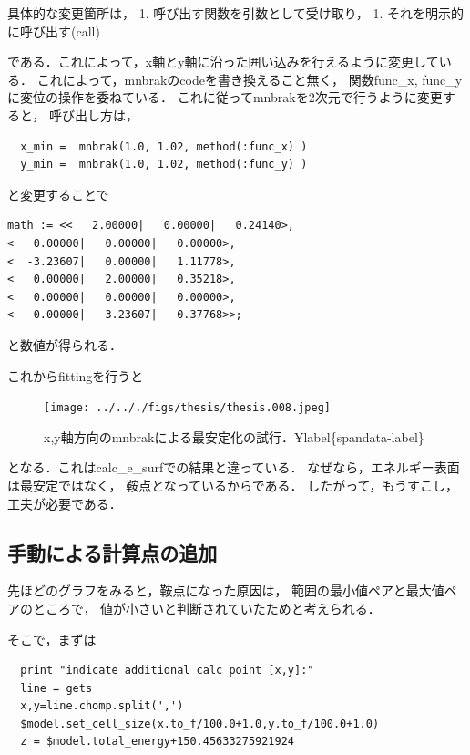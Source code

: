 具体的な変更箇所は， 1. 呼び出す関数を引数として受け取り， 1.
それを明示的に呼び出す(call)

である．これによって，x軸とy軸に沿った囲い込みを行えるように変更している．
これによって，mnbrakのcodeを書き換えること無く， 関数func\_x,
func\_yに変位の操作を委ねている．
これに従ってmnbrakを2次元で行うように変更すると， 呼び出し方は，

\begin{verbatim}
  x_min =  mnbrak(1.0, 1.02, method(:func_x) )
  y_min =  mnbrak(1.0, 1.02, method(:func_y) )
\end{verbatim}

と変更することで

\begin{verbatim}
math := <<   2.00000|   0.00000|   0.24140>,
<   0.00000|   0.00000|   0.00000>,
<  -3.23607|   0.00000|   1.11778>,
<   0.00000|   2.00000|   0.35218>,
<   0.00000|   0.00000|   0.00000>,
<   0.00000|  -3.23607|   0.37768>>;
\end{verbatim}

と数値が得られる．

これからfittingを行うと

\begin{figure}[H]
\centering
\begin{center}
\texttt{[image: ../.././figs/thesis/thesis.008.jpeg]}
\end{center}
\caption{x,y軸方向のmnbrakによる最安定化の試行．¥label\{spandata-label\}}

\label{fig:}
\end{figure}

となる．これはcalc\_e\_surfでの結果と違っている．
なぜなら，エネルギー表面は最安定ではなく， 鞍点となっているからである．
したがって，もうすこし，工夫が必要である．

    \subsection{手動による計算点の追加}\label{ux624bux52d5ux306bux3088ux308bux8a08ux7b97ux70b9ux306eux8ffdux52a0}

先ほどのグラフをみると，鞍点になった原因は，
範囲の最小値ペアと最大値ペアのところで，
値が小さいと判断されていたためと考えられる．

そこで，まずは

\begin{verbatim}
  print "indicate additional calc point [x,y]:"
  line = gets
  x,y=line.chomp.split(',')
  $model.set_cell_size(x.to_f/100.0+1.0,y.to_f/100.0+1.0)
  z = $model.total_energy+150.45633275921924
\end{verbatim}

